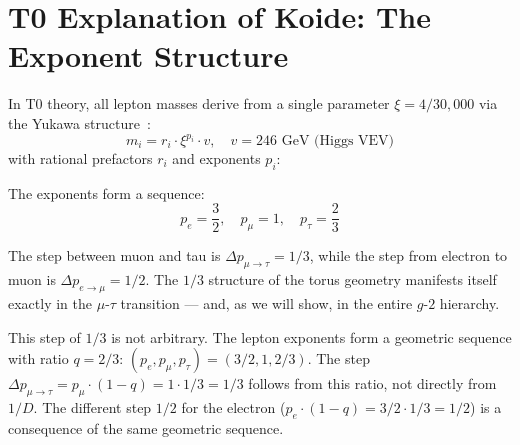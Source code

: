 \section{T0 Explanation of Koide: The Exponent Structure}

In T0 theory, all lepton masses derive from a single parameter $\xi = 4/30{,}000$ via the Yukawa structure~\cite{Pascher006}:
\begin{equation}
	m_i = r_i \cdot \xi^{p_i} \cdot v, \quad v = 246 \text{ GeV (Higgs VEV)}
	\label{eq:yukawa}
\end{equation}
with rational prefactors $r_i$ and exponents $p_i$:

\begin{table}[h]
	\centering
	\caption{T0 lepton masses from a single parameter $\xi$}
	\label{tab:masses}
\end{table}

The exponents form a sequence:
\begin{equation}
	p_e = \frac{3}{2}, \quad p_\mu = 1, \quad p_\tau = \frac{2}{3}
	\label{eq:exponents}
\end{equation}

The step between muon and tau is $\Delta p_{\mu\to\tau} = 1/3$, while the step from electron to muon is $\Delta p_{e\to\mu} = 1/2$. The $1/3$ structure of the torus geometry manifests itself exactly in the $\mu$-$\tau$ transition --- and, as we will show, in the entire $g$-$2$ hierarchy.

This step of $1/3$ is not arbitrary. The lepton exponents form a geometric
sequence with ratio $q = 2/3$: $(p_e, p_\mu, p_\tau) = (3/2, 1, 2/3)$.
The step $\Delta p_{\mu\to\tau} = p_\mu \cdot (1-q) = 1 \cdot 1/3 = 1/3$
follows from this ratio, not directly from $1/D$.
The different step $1/2$ for the electron
($p_e \cdot (1-q) = 3/2 \cdot 1/3 = 1/2$) is a consequence
of the same geometric sequence.

